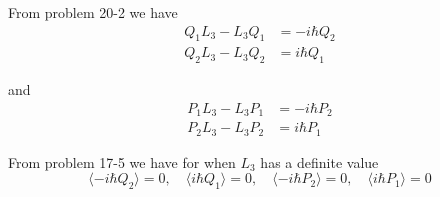


\bigskip
From problem 20-2 we have
\begin{align*}
Q_1L_3-L_3Q_1&=-i\hbar Q_2
\\
Q_2L_3-L_3Q_2&=i\hbar Q_1
\end{align*}

and
\begin{align*}
P_1L_3-L_3P_1&=-i\hbar P_2
\\
P_2L_3-L_3P_2&=i\hbar P_1
\end{align*}

From problem 17-5 we have for when $L_3$ has a definite value
\begin{equation*}
\langle -i\hbar Q_2\rangle=0,\quad
\langle i\hbar Q_1\rangle=0,\quad
\langle -i\hbar P_2\rangle=0,\quad
\langle i\hbar P_1\rangle=0
\end{equation*}



